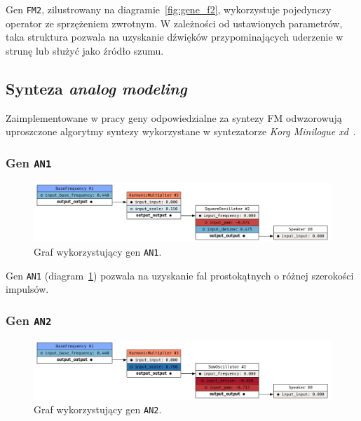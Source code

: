 Gen \texttt{FM2}, zilustrowany na diagramie~\ref{fig:gene_f2}, wykorzystuje pojedynczy
operator ze sprzężeniem zwrotnym. W zależności od ustawionych parametrów, taka struktura pozwala
na uzyskanie dźwięków przypominających uderzenie w strunę lub służyć jako źródło szumu.

\subsection{Synteza \textit{analog modeling}}

Zaimplementowane w pracy geny odpowiedzialne za syntezy FM odwzorowują uproszczone algorytmy syntezy wykorzystane
w syntezatorze \textit{Korg Minilogue xd}~\cite{yamaha_dx7_manual}.

\subsubsection{Gen \texttt{AN1}}

\begin{figure}[H]
    \centering
    \includegraphics[width=1.0\linewidth]{rys06/gene_an1.png}
    \caption{
      Graf wykorzystujący gen \texttt{AN1}.
    }\label{fig:gene_an1}
\end{figure}

Gen \texttt{AN1} (diagram~\ref{fig:gene_an1}) pozwala na uzyskanie fal prostokątnych o różnej szerokości impulsów.


\subsubsection{Gen \texttt{AN2}}

\begin{figure}[H]
    \centering
    \includegraphics[width=1.0\linewidth]{rys06/gene_an2.png}
    \caption{
      Graf wykorzystujący gen \texttt{AN2}.
    }\label{fig:gene_an2}
\end{figure}

